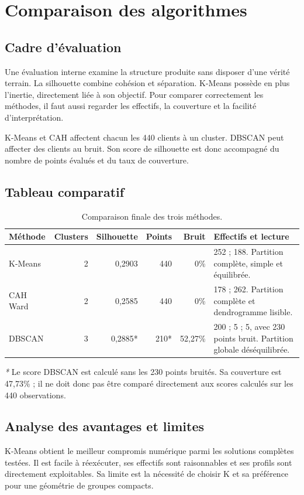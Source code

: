 \chapter{Comparaison des algorithmes}

\section{Cadre d'évaluation}
Une évaluation interne examine la structure produite sans disposer d'une vérité terrain. La silhouette combine cohésion et séparation. K-Means possède en plus l'inertie, directement liée à son objectif. Pour comparer correctement les méthodes, il faut aussi regarder les effectifs, la couverture et la facilité d'interprétation.

K-Means et CAH affectent chacun les 440 clients à un cluster. DBSCAN peut affecter des clients au bruit. Son score de silhouette est donc accompagné du nombre de points évalués et du taux de couverture.

\section{Tableau comparatif}
\begin{table}[H]
\centering\scriptsize
\caption{Comparaison finale des trois méthodes.}
\label{tab:comparison}
\begin{tabularx}{\textwidth}{lrrrrX}
\toprule
Méthode & Clusters & Silhouette & Points & Bruit & Effectifs et lecture \\
\midrule
K-Means & 2 & 0,2903 & 440 & 0\% & 252 ; 188. Partition complète, simple et équilibrée. \\
CAH Ward & 2 & 0,2585 & 440 & 0\% & 178 ; 262. Partition complète et dendrogramme lisible. \\
DBSCAN & 3 & 0,2885* & 210* & 52,27\% & 200 ; 5 ; 5, avec 230 points bruit. Partition globale déséquilibrée. \\
\bottomrule
\end{tabularx}
\end{table}

\textit{*} Le score DBSCAN est calculé sans les 230 points bruités. Sa couverture est 47,73\% ; il ne doit donc pas être comparé directement aux scores calculés sur les 440 observations.


\section{Analyse des avantages et limites}
K-Means obtient le meilleur compromis numérique parmi les solutions complètes testées. Il est facile à réexécuter, ses effectifs sont raisonnables et ses profils sont directement exploitables. Sa limite est la nécessité de choisir K et sa préférence pour une géométrie de groupes compacts.

